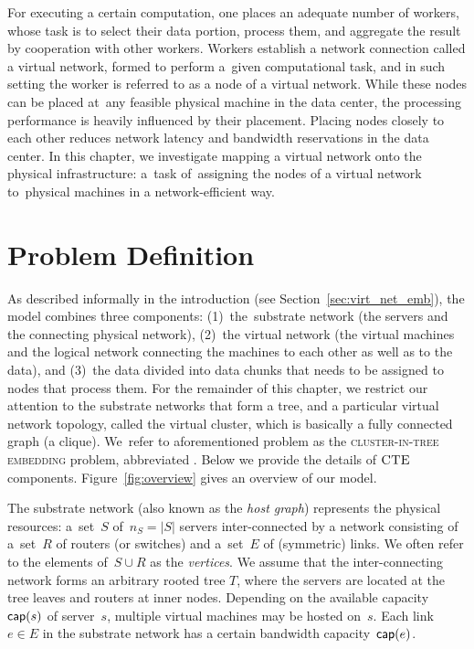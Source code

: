 
For executing a certain computation, one places an adequate number of workers, whose task is to select their data portion, process them, and aggregate the result by cooperation with other workers.
Workers establish a network connection called a virtual network, formed to perform a~given computational task, and in such setting the worker is referred to as a node of a virtual network.
While these nodes can be placed at~any feasible physical machine in the data center, the processing performance is heavily influenced by their placement.
Placing nodes closely to each other reduces network latency and bandwidth reservations in the data center.
In this chapter, we investigate mapping a virtual network onto the physical infrastructure: a~task of~assigning the nodes of a virtual network to~physical machines in a network-efficient way.

\section{Problem Definition}\label{sec:model}

As described informally in the introduction (see Section~\ref{sec:virt_net_emb}), the model combines three components: (1)~the~substrate network (the servers
and the connecting physical network),
(2)~the virtual network (the virtual machines and the logical network connecting the machines to each other
as well as to the data), and (3)~the data divided into data chunks that needs to be assigned to nodes that process them.
For the remainder of this chapter, we restrict our attention to the substrate networks that form a tree, and a particular virtual network topology, called the virtual cluster, which is basically a fully connected graph (a clique).
We~refer to aforementioned problem as the \textsc{cluster-in-tree embedding} problem, abbreviated \CTE.
Below we provide the details of $\textsc{CTE}$ components. Figure~\ref{fig:overview} gives an overview of our model.


 The substrate network (also known as the \emph{host graph}) represents the physical resources:
a~set~$S$ of~$n_S=|S|$ servers inter-connected by a network consisting of a~set~$R$ of routers (or switches)
and a~set~$E$ of (symmetric) links. We often refer to the elements of~$S\cup R$
as the \emph{vertices}. We assume that the inter-connecting network forms an arbitrary rooted tree $T$,
where the servers are located at the tree leaves and routers at inner nodes.
Depending on the available capacity~$\textsf{cap}(s)$ of server~$s$, multiple virtual machines may be hosted on~$s$.
Each link~$e\in E$ in the substrate network has a certain bandwidth capacity~$\textsf{cap}(e)$.

